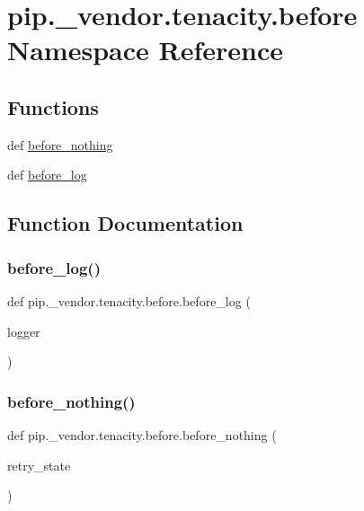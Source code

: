 \hypertarget{namespacepip_1_1__vendor_1_1tenacity_1_1before}{}\section{pip.\+\_\+vendor.\+tenacity.\+before Namespace Reference}
\label{namespacepip_1_1__vendor_1_1tenacity_1_1before}
\subsection*{Functions}
\begin{DoxyCompactItemize}
\item 
def \hyperlink{namespacepip_1_1__vendor_1_1tenacity_1_1before_a5e551709bbcca362a20286f679459f7f}{before\+\_\+nothing}
\item 
def \hyperlink{namespacepip_1_1__vendor_1_1tenacity_1_1before_a183c14b396f971fc3df5ad6ef3c61317}{before\+\_\+log}
\end{DoxyCompactItemize}


\subsection{Function Documentation}
\mbox{\label{namespacepip_1_1__vendor_1_1tenacity_1_1before_a183c14b396f971fc3df5ad6ef3c61317}} 
\subsubsection{\texorpdfstring{before\+\_\+log()}{before\_log()}}
{\footnotesize\ttfamily def pip.\+\_\+vendor.\+tenacity.\+before.\+before\+\_\+log (\begin{DoxyParamCaption}\item[{}]{logger }\end{DoxyParamCaption})}

\mbox{\label{namespacepip_1_1__vendor_1_1tenacity_1_1before_a5e551709bbcca362a20286f679459f7f}} 
\subsubsection{\texorpdfstring{before\+\_\+nothing()}{before\_nothing()}}
{\footnotesize\ttfamily def pip.\+\_\+vendor.\+tenacity.\+before.\+before\+\_\+nothing (\begin{DoxyParamCaption}\item[{}]{retry\+\_\+state }\end{DoxyParamCaption})}

